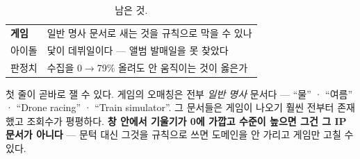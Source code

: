 \documentclass[10pt]{article}
\begin{document}

\begin{table}[t]
\centering\tsize
\caption{남은 것.}
\begin{tabular}{ll}
\toprule
\textbf{게임} & 일반 명사 문서로 새는 것을 규칙으로 막을 수 있나 \\
아이돌 & 닻이 데뷔일이다 --- 앨범 발매일을 못 찾았다 \\
판정치 & 수집을 0$\to$79\% 올려도 안 움직이는 것이 옳은가 \\
\bottomrule
\end{tabular}
\end{table}

첫 줄이 곧바로 잴 수 있다. 게임의 오매칭은 전부 \emph{일반 명사} 문서다
--- ``물'' · ``여름'' · ``Drone racing'' · ``Train simulator''. 그 문서들은
게임이 나오기 훨씬 전부터 존재했고 조회수가 평평하다. \textbf{창 안에서
기울기가 0에 가깝고 수준이 높으면 그건 그 IP 문서가 아니다} --- 문턱
대신 그것을 규칙으로 쓰면 도메인을 안 가리고 게임만 고칠 수 있다.
\end{document}
